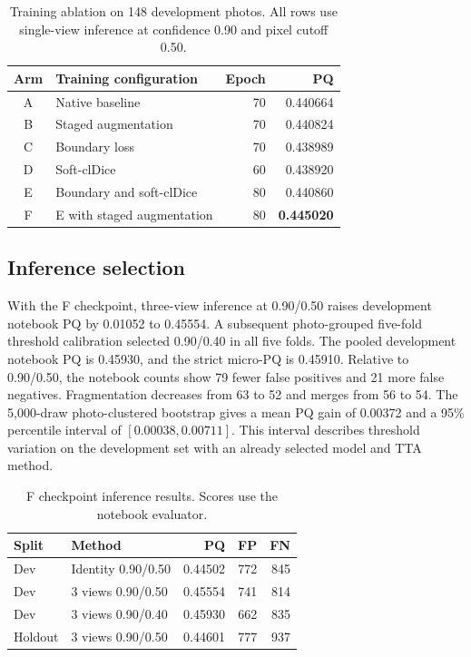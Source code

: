 \documentclass[sigconf]{acmart}
\begin{document}
\begin{table}[h]
\caption{Training ablation on 148 development photos. All rows use single-view inference at confidence 0.90 and pixel cutoff 0.50.}
\label{tab:ablation}
\centering
\small
\begin{tabular}{clrr}
\toprule
Arm & Training configuration & Epoch & PQ \\
\midrule
A & Native baseline & 70 & 0.440664 \\
B & Staged augmentation & 70 & 0.440824 \\
C & Boundary loss & 70 & 0.438989 \\
D & Soft-clDice & 60 & 0.438920 \\
E & Boundary and soft-clDice & 80 & 0.440860 \\
F & E with staged augmentation & 80 & \textbf{0.445020} \\
\bottomrule
\end{tabular}
\end{table}

\newpage
\subsection{Inference selection}
With the F checkpoint, three-view inference at 0.90/0.50 raises development notebook PQ by 0.01052 to 0.45554. A subsequent photo-grouped five-fold threshold calibration selected 0.90/0.40 in all five folds. The pooled development notebook PQ is 0.45930, and the strict micro-PQ is 0.45910. Relative to 0.90/0.50, the notebook counts show 79 fewer false positives and 21 more false negatives. Fragmentation decreases from 63 to 52 and merges from 56 to 54. The 5,000-draw photo-clustered bootstrap gives a mean PQ gain of 0.00372 and a 95\% percentile interval of $[0.00038, 0.00711]$. This interval describes threshold variation on the development set with an already selected model and TTA method.

\begin{table}[h]
\caption{F checkpoint inference results. Scores use the notebook evaluator.}
\label{tab:inference}
\centering
\small
\begin{tabular}{llrrr}
\toprule
Split & Method & PQ & FP & FN \\
\midrule
Dev & Identity 0.90/0.50 & 0.44502 & 772 & 845 \\
Dev & 3 views 0.90/0.50 & 0.45554 & 741 & 814 \\
Dev & 3 views 0.90/0.40 & 0.45930 & 662 & 835 \\
Holdout & 3 views 0.90/0.50 & 0.44601 & 777 & 937 \\
\bottomrule
\end{tabular}
\end{table}
\end{document}

